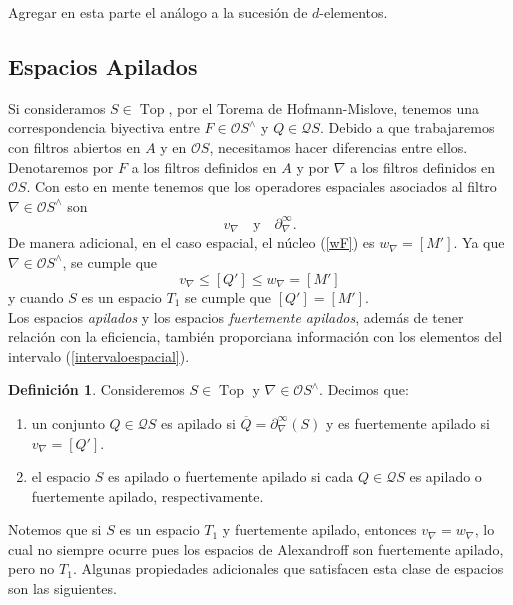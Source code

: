 \documentclass[11pt]{amsart}
\DeclareMathOperator{\Top}{Top}
\theoremstyle{plain}
\theoremstyle{definition}
\newtheorem{dfn}[thm]{Definición}
\begin{document}
Agregar en esta parte el análogo a la sucesión de $d$-elementos.

\subsection{Espacios Apilados}
Si consideramos $S\in \Top$, por el Torema de Hofmann-Mislove, tenemos una correspondencia biyectiva entre 
$F\in \mathcal{O}S^\wedge$ y $Q\in \mathcal{Q}S$. Debido a que trabajaremos con filtros 
abiertos en $A$ y en $\mathcal{O}S$, necesitamos hacer diferencias entre ellos.\\ 

Denotaremos por $F$ a los filtros definidos en $A$ 
y por $\nabla$ a los filtros definidos en $\mathcal{O}S$.
Con esto en mente tenemos que los operadores espaciales asociados al filtro $\nabla\in \mathcal{O}S^\wedge$ son
\[
v_\nabla\quad\text{y}\quad \partial_\nabla^\infty. 
\]
De manera adicional, en el caso espacial, el núcleo (\ref{wF}) es $w_\nabla=[M']$. Ya que $\nabla\in \mathcal{O}S^\wedge$, se cumple que 
\begin{equation}\label{intervaloespacial}
    v_\nabla\leq [Q']\leq  w_\nabla=[M']
\end{equation}
y cuando $S$ es un espacio $T_1$ se cumple que $[Q']=[M']$.\\

Los espacios \emph{apilados} y los espacios \emph{fuertemente apilados}, además de tener relación con la eficiencia, también proporciana información
con los elementos del intervalo (\ref{intervaloespacial}).

\begin{dfn}\label{def:apilado}
Consideremos $S\in\Top$ y $\nabla\in \mathcal{O}S^\wedge$. Decimos que:
\begin{enumerate}
  \item un conjunto $Q\in \mathcal{Q}S$ es apilado si $\overline{Q}=\partial_\nabla^\infty(S)$ y es fuertemente apilado si $v_\nabla=[Q']$.
  \item el espacio $S$ es apilado o fuertemente apilado si cada $Q\in \mathcal{Q}S$ es apilado o fuertemente apilado, respectivamente.
\end{enumerate}
\end{dfn}

Notemos que si $S$ es un espacio $T_1$ y fuertemente apilado, entonces $v_\nabla=w_\nabla$, lo cual no siempre ocurre pues los espacios de Alexandroff son fuertemente apilado, pero 
no $T_1$. Algunas propiedades adicionales que satisfacen esta clase de espacios son las siguientes.
\end{document}
